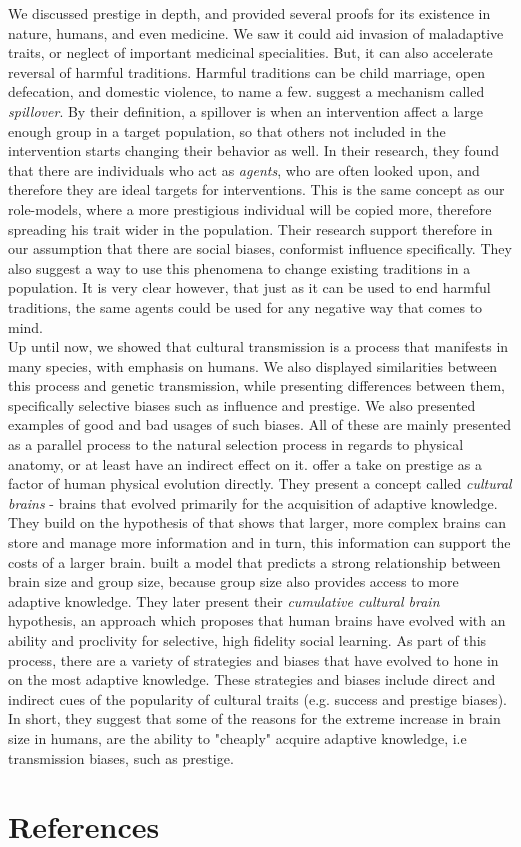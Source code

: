 \documentclass[12pt]{extarticle}
\begin{document}
We discussed prestige in depth, and provided several proofs for its existence in nature, humans, and even medicine. We saw it could aid invasion of maladaptive traits, or neglect of important medicinal specialities. But, it can also accelerate reversal of harmful traditions.
Harmful traditions can be child marriage, open defecation, and domestic violence, to name a few. 
\citet{harmful_traditions} suggest a mechanism called \textit{spillover}. By their definition, a spillover is when an intervention affect a large enough group in a target population, so that others not included in the intervention starts changing their behavior as well. In their research, they found that there are individuals who act as \textit{agents}, who are often looked upon, and therefore they are ideal targets for interventions. This is the same concept as our role-models, where a more prestigious individual will be copied more, therefore spreading his trait wider in the population. Their research support therefore in our assumption that there are social biases, conformist influence specifically. They also suggest a way to use this phenomena to change existing traditions in a population. It is very clear however, that just as it can be used to end harmful traditions, the same agents could be used for any negative way that comes to mind.\\

Up until now, we showed that cultural transmission is a process that manifests in many species, with emphasis on humans. We also displayed similarities between this process and genetic transmission, while presenting differences between them, specifically selective biases such as influence and prestige. We also presented examples of good and bad usages of such biases. All of these are mainly presented as a parallel process to the natural selection process in regards to physical anatomy, or at least have an indirect effect on it. \citet{collective_brains} offer a take on prestige as a factor of human physical evolution directly. They present a concept called \textit{cultural brains} - brains that evolved primarily for the acquisition of adaptive knowledge.
They build on the hypothesis of \citet{social_brains} that shows that larger, more complex brains can store and manage more information and in turn, this information can support the costs of a larger brain.
\citet{collective_brains} built a model that predicts a strong relationship between brain size and group size, because group size also provides access to more adaptive knowledge. They later present their \textit{cumulative cultural brain} hypothesis, an approach which proposes that human brains have evolved with an ability and proclivity for selective, high fidelity social learning. As part of this process, there are a variety of strategies and biases that have evolved to hone in on the most adaptive knowledge. These strategies and biases include direct and indirect cues of the popularity of cultural traits (e.g. success and prestige biases).
In short, they suggest that some of the reasons for the extreme increase in brain size in humans, are the ability to "cheaply" acquire adaptive knowledge, i.e transmission biases, such as prestige.

\pagebreak

\section*{References}
\nolinenumbers

%

\end{document}
